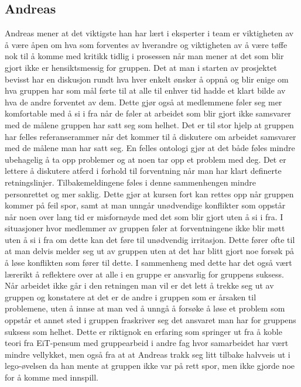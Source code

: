\documentclass[a4paper,norsk,oneside]{article}
\begin{document}
\subsection{Andreas}
Andreas mener at det viktigste han har lært i eksperter i team er viktigheten av å være åpen om hva som forventes av hverandre og viktigheten av å være tøffe nok til å komme med kritikk tidlig i prosessen når man mener at det som blir gjort ikke  er hensiktsmessig for gruppen. Det at man i starten av prosjektet bevisst har en diskusjon rundt hva hver enkelt ønsker å oppnå og blir enige om hva gruppen har som mål førte til at alle til enhver tid hadde et klart bilde av hva de andre forventet av dem. Dette gjør også at medlemmene føler seg mer komfortable med å si i fra når de føler at arbeidet som blir gjort ikke samsvarer med de målene gruppen har satt seg som helhet. Det er til stor hjelp at gruppen har felles referanserammer når det kommer til å diskutere om arbeidet samsvarer med de målene man har satt seg. En felles ontologi gjør at det både føles mindre ubehagelig å ta opp problemer og at noen tar opp et problem med deg. Det er lettere å diskutere atferd i forhold til forventning når man har klart definerte retningslinjer. Tilbakemeldingene føles i denne sammenhengen mindre personrettet og mer saklig. Dette gjør at kursen fort kan rettes opp når gruppen kommer på feil spor, samt at man unngår unødvendige konflikter som oppstår når noen over lang tid er misfornøyde med det som blir gjort uten å si i fra. I situasjoner hvor medlemmer av gruppen føler at forventningene ikke blir møtt uten å si i fra om dette kan det føre til unødvendig irritasjon. Dette fører ofte til at man delvis melder seg ut av gruppen uten at det har blitt gjort noe forsøk på å løse konflikten som fører til dette. I sammenheng med dette har det også vært lærerikt å reflektere over at alle i en gruppe er ansvarlig for gruppens suksess. Når arbeidet ikke går i den retningen man vil er det lett å trekke seg ut av gruppen og konstatere at det er de andre i gruppen som er årsaken til problemene, uten å innse at man ved å unngå å forsøke å løse et problem som oppstår et annet sted i gruppen fraskriver seg det ansvaret man har for gruppens suksess som helhet. Dette er riktignok en erfaring som springer ut fra å koble teori fra EiT-pensum med gruppearbeid i andre fag hvor samarbeidet har vært mindre vellykket, men også fra at at Andreas trakk seg litt tilbake halvveis ut i lego-øvelsen da han mente at gruppen ikke var på rett spor, men ikke gjorde noe for å komme med innspill.  
\end{document}
